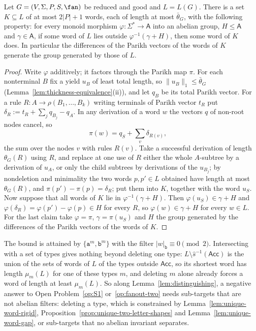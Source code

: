 \begin{proposition}
\label{prop:abelian-filter-short}
Let $G=(V,\Sigma,P,S,\fan)$ be reduced and good and $L=L(G)$.  There is a set
$K\subseteq L$ of at most $2|P|+1$ words, each of length at most $\bar\theta_G$, with
the following property: for every monoid morphism $\varphi:\Sigma^*\to\mathsf A$
into an abelian group, $H\le\mathsf A$ and $\gamma\in\mathsf A$, if some word of $L$
lies outside $\varphi^{-1}(\gamma+H)$, then some word of $K$ does.  In particular the
differences of the Parikh vectors of the words of $K$ generate the group generated
by those of $L$.
\end{proposition}

\begin{proof}
Write $\varphi$ additively; it factors through the Parikh map $\pi$.  For each
nonterminal $B$ fix a yield $u_B$ of least total length, so $\|u_B\|_1\le\bar\theta_G$
(Lemma~\ref{lem:thickness-equivalence}(ii)), and let $q_B$ be its total Parikh
vector.  For a rule $R:A\to\rho(B_1,\ldots,B_k)$ writing terminals of Parikh vector
$t_R$ put $\delta_R:=t_R+\sum_jq_{B_j}-q_A$.  In any derivation of a word $w$ the
vectors $q$ of non-root nodes cancel, so
\[
 \pi(w)=q_S+\sum_v\delta_{R(v)},
\]
the sum over the nodes $v$ with rules $R(v)$.  Take a successful derivation of
length $\theta_G(R)$ using $R$, and replace at one use of $R$ either the whole
$A$-subtree by a derivation of $u_A$, or only the child subtrees by derivations
of the $u_{B_j}$; by nondeletion and minimality the two words $p,p'\in L$ obtained
have length at most $\theta_G(R)$, and $\pi(p')-\pi(p)=\delta_R$; put them into $K$,
together with the word $u_S$.  Now suppose that all words of $K$ lie in
$\varphi^{-1}(\gamma+H)$.  Then $\varphi(u_S)\in\gamma+H$ and
$\varphi(\delta_R)=\varphi(p')-\varphi(p)\in H$ for every $R$, so
$\varphi(w)\in\gamma+H$ for every $w\in L$.  For the last claim take
$\varphi=\pi$, $\gamma=\pi(u_S)$ and $H$ the group generated by the differences
of the Parikh vectors of the words of $K$.
\end{proof}

The bound is attained by $\{\mathtt a^m,\mathtt b^m\}$ with the filter
$|w|_{\mathtt b}\equiv0\pmod2$.  Intersecting with a set of types gives nothing
beyond deleting one type: $L\setminus\widehat s^{-1}(\mathsf{Acc})$ is the union of
the sets of words of $L$ of the types outside $\mathsf{Acc}$, so its shortest word
has length $\mu_m(L)$ for one of these types $m$, and deleting $m$ alone already
forces a word of length at least $\mu_m(L)$.  So along Lemma~\ref{lem:distinguishing}, a negative
answer to Open Problem~\ref{op:S1} or~\ref{op:fanout-two} needs sub-targets that are
not abelian filters: deleting a type, which is constrained by
Lemma~\ref{lem:unique-word-rigid}, Proposition~\ref{prop:unique-two-letter-shapes}
and Lemma~\ref{lem:unique-word-gap}, or sub-targets that no abelian invariant
separates.


